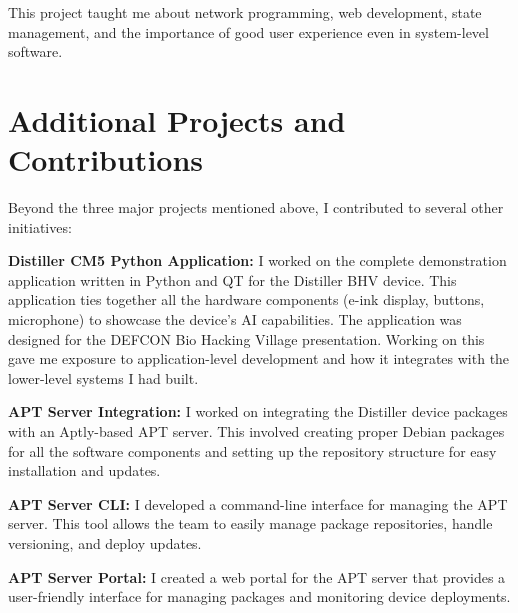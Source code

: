 \documentclass[12pt,a4paper]{report}
\begin{document}
\vspace{0.3cm}

This project taught me about network programming, web development, state management, and the importance of good user experience even in system-level software.


\section{Additional Projects and Contributions}

Beyond the three major projects mentioned above, I contributed to several other initiatives:

\vspace{0.3cm}

\textbf{Distiller CM5 Python Application:} I worked on the complete demonstration application written in Python and QT for the Distiller BHV device. This application ties together all the hardware components (e-ink display, buttons, microphone) to showcase the device's AI capabilities. The application was designed for the DEFCON Bio Hacking Village presentation. Working on this gave me exposure to application-level development and how it integrates with the lower-level systems I had built.

\vspace{0.3cm}

\textbf{APT Server Integration:} I worked on integrating the Distiller device packages with an Aptly-based APT server. This involved creating proper Debian packages for all the software components and setting up the repository structure for easy installation and updates.

\vspace{0.3cm}

\textbf{APT Server CLI:} I developed a command-line interface for managing the APT server. This tool allows the team to easily manage package repositories, handle versioning, and deploy updates.

\vspace{0.3cm}

\textbf{APT Server Portal:} I created a web portal for the APT server that provides a user-friendly interface for managing packages and monitoring device deployments.
\end{document}
